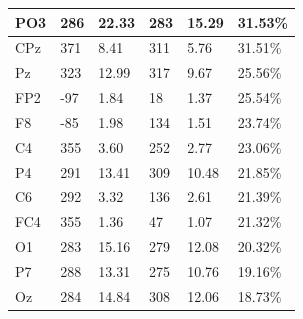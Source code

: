 \documentclass[a4paper]{article}
\begin{document}
\begin{table}[]
\begin{tabular}{|l|l|l|l|l|l|}
PO3              & 286                         & 22.33                        & 283                             & 15.29                            & 31.53\%                        \\ \hline
CPz              & 371                         & 8.41                         & 311                             & 5.76                             & 31.51\%                        \\ \hline
Pz               & 323                         & 12.99                        & 317                             & 9.67                             & 25.56\%                        \\ \hline
FP2              & -97                         & 1.84                         & 18                              & 1.37                             & 25.54\%                        \\ \hline
F8               & -85                         & 1.98                         & 134                             & 1.51                             & 23.74\%                        \\ \hline
C4               & 355                         & 3.60                         & 252                             & 2.77                             & 23.06\%                        \\ \hline
P4               & 291                         & 13.41                        & 309                             & 10.48                            & 21.85\%                        \\ \hline
C6               & 292                         & 3.32                         & 136                             & 2.61                             & 21.39\%                        \\ \hline
FC4              & 355                         & 1.36                         & 47                              & 1.07                             & 21.32\%                        \\ \hline
O1               & 283                         & 15.16                        & 279                             & 12.08                            & 20.32\%                        \\ \hline
P7               & 288                         & 13.31                        & 275                             & 10.76                            & 19.16\%                        \\ \hline
Oz               & 284                         & 14.84                        & 308                             & 12.06                            & 18.73\%                        \\ \hline

\end{tabular}
\end{table}
\end{document}
